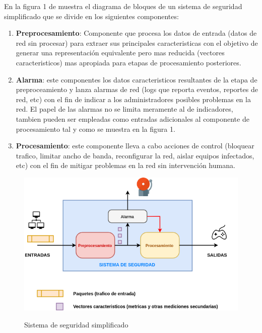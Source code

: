 \documentclass[12pt]{article}
\begin{document}
En la figura 1 de muestra el diagrama de bloques de un sistema de seguridad simplificado que se divide en los siguientes componentes:
\begin{enumerate}
\item \textbf{Preprocesamiento}: Componente que procesa los datos de entrada (datos de red sin procesar) para extraer sus principales caracteristicas con el objetivo de generar una representación equivalente pero mas reducida (vectores caracteristicos) mas apropiada para etapas de procesamiento posteriores.
\item \textbf{Alarma}: este componentes los datos caracteristicos resultantes de la etapa de preproceamiento y lanza alarmas de red (logs que reporta eventos, reportes de red, etc) con el fin de indicar a los administradores posibles problemas en la red. El papel de las alarmas no se limita meramente al de indicadores, tambien pueden ser empleadas como entradas adicionales al componente de procesamiento tal y como se muestra en la figura 1.
\item \textbf{Procesamiento}: este componente lleva a cabo acciones de control (bloquear trafico, limitar ancho de banda, reconfigurar la red, aislar equipos infectados, etc) con el fin de mitigar problemas en la red sin intervención humana.
\end{enumerate}

\begin{figure}[htbp]
\begin{center}
\includegraphics[scale=0.5]{sistema_simplificado2.png}\\[1cm] %
\caption{Sistema de seguridad simplificado}
\end{center}
\end{figure}
\end{document}

